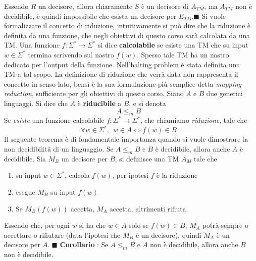 \documentclass[10pt, letterpaper]{report}
\begin{document}
Essendo $R$ un decisore, allora chiaramente $S$ è un decisore di $A_{TM}$, ma $A_{TM}$ non è decidibile, è quindi impossibile che esista un decisore per $E_{TM}$.\hfill$\blacksquare$\acc 
Si vuole formalizzare il concetto di riduzione, intuitivamente si può dire che la riduzione è definita da una funzione, che negli obiettivi di questo corso sarà calcolata da una TM.\acc 
{} Una funzione $f:\Sigma^* \rightarrow \Sigma^*$ si dice \textbf{calcolabile} se esiste una TM che su input $w\in \Sigma^*$ termina scrivendo sul nastro $f(w)$. Spesso tale TM ha un nastro dedicato per l'output della funzione.\acc 
Nell'halting problem è stata definita una TM a tal scopo. La definizione di riduzione che verrà data non rappresenta il concetto in senso lato, bensì è la sua formulazione più semplice detta \textit{mapping reduction}, sufficiente per gli obiettivi di questo corso.\acc 
{} Siano $A$ e $B$ due generici linguaggi. Si dice che $A$ è \textbf{riducibile} a $B$, e si denota 
$$ A\le_m B$$
Se \textit{esiste} una funzione calcolabile $f:\Sigma^*\rightarrow \Sigma^*$, che chiamiamo \textit{riduzione}, tale che 
$$ \forall w\in\Sigma^*, \ \ w\in A \iff f(w)\in B$$
Il seguente teorema è di fondamentale importanza quando si vuole dimostrare la non decidibilità di un linguaggio.\acc 
\teo{} Se $A\le_m B$ e $B$ è decidibile, allora  anche $A$ è decidibile.\acc 
\dimo{} Sia $M_B$ un decisore per $B$, si definisce una TM $A_M$ tale che \begin{enumerate}
    \item su input $w\in\Sigma^*$, calcola $f(w)$, per ipotesi $f$ è la riduzione
    \item esegue $M_B$ su input $f(w)$ 
    \item Se $M_B(f(w))$ accetta, $M_A$ accetta, altrimenti rifiuta.
\end{enumerate}
Essendo che, per ogni $w$ si ha che $w\in A$ solo se $f(w)\in B$, $M_A$ potrà sempre o accettare o rifiutare (data l'ipotesi che $M_B$ è un decisore), quindi  $M_A$ è un decisore per $A$.
\hfill$\blacksquare$\acc 
\textbf{Corollario} : Se $A\le_m B$ e $A$ non è decidibile, allora  anche $B$ non è decidibile.
\end{document}
